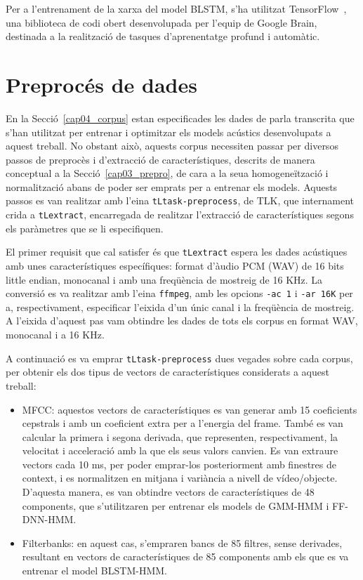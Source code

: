     Per a l'entrenament de la xarxa del model BLSTM, s'ha utilitzat TensorFlow~\cite{tensorflow}, una biblioteca de codi obert desenvolupada per l'equip de Google Brain, destinada a la realització de tasques d'aprenentatge profund i automàtic.
    

\section{Preprocés de dades}
\label{cap05_prepro}

En la Secció~\ref{cap04_corpus} estan especificades les dades de parla transcrita que s'han utilitzat per entrenar i optimitzar els models acústics desenvolupats a aquest treball. No obstant això, aquests corpus necessiten passar per diversos passos de preprocès i d'extracció de característiques, descrits de manera conceptual a la Secció~\ref{cap03_prepro}, de cara a la seua homogeneïtzació i normalització abans de poder ser emprats per a entrenar els models.
Aquests passos es van realitzar amb l'eina \texttt{tLtask-preprocess}, de TLK, que internament crida a \texttt{tLextract}, encarregada de realitzar l'extracció de característiques segons els paràmetres que se li especifiquen.

El primer requisit que cal satisfer és que \texttt{tLextract} espera les dades acústiques amb unes característiques específiques: format d'àudio PCM (WAV) de 16 bits little endian, monocanal i amb una freqüència de mostreig de 16 KHz. 
La conversió es va realitzar amb l'eina \texttt{ffmpeg}, amb les opcions \texttt{-ac 1} i \texttt{-ar 16K} per a, respectivament, especificar l'eixida d'un únic canal i la freqüència de mostreig.
A l'eixida d'aquest pas vam obtindre les dades de tots els corpus en format WAV, monocanal i a 16 KHz.

A continuació es va emprar \texttt{tLtask-preprocess} dues vegades sobre cada corpus, per obtenir els dos tipus de vectors de característiques considerats a aquest treball:

\begin{itemize}
    \item MFCC: aquestos vectors de característiques es van generar amb 15 coeficients cepstrals i amb un coeficient extra per a l'energia del frame. També es van calcular la primera i segona derivada, que representen, respectivament, la velocitat i acceleració amb la que els seus valors canvien.
    Es van extraure vectors cada 10 ms, per poder emprar-los posteriorment amb finestres de context, i es normalitzen en mitjana i variància a nivell de vídeo/objecte. 
    D'aquesta manera, es van obtindre vectors de característiques de 48 components, que s'utilitzaren per entrenar els models de GMM-HMM i FF-DNN-HMM.

    \item Filterbanks: en aquest cas, s'empraren bancs de 85 filtres, sense derivades, resultant en vectors de característiques de 85 components amb els que es va entrenar el model BLSTM-HMM. 
\end{itemize}

